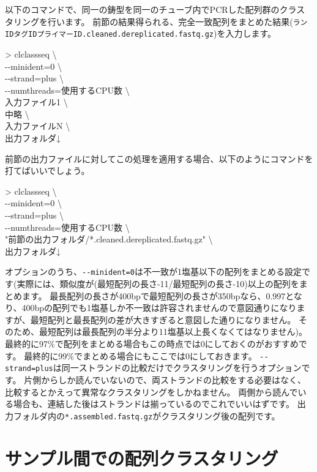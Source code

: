 \documentclass[titlepage,10pt,a4paper]{jsbook}
\newenvironment{cmd}{\begin{oframed}\raggedright\ttfamily\footnotesize\setlength{\baselineskip}{1.4em}}{\end{oframed}\vspace{-1em}}
\begin{document}
以下のコマンドで、同一の鋳型を同一のチューブ内でPCRした配列群のクラスタリングを行います。
前節の結果得られる、完全一致配列をまとめた結果(\texttt{ランID{\textunderscore}{\textunderscore}タグID{\textunderscore}{\textunderscore}プライマーID.cleaned.dereplicated.fastq.gz})を入力します。
\begin{cmd}
{\textgreater} clclassseq {\textbackslash}\\
{-}{-}minident=0 {\textbackslash}\\
{-}{-}strand=plus {\textbackslash}\\
{-}{-}numthreads=使用するCPU数 {\textbackslash}\\
入力ファイル1 {\textbackslash}\\
中略 {\textbackslash}\\
入力ファイルN {\textbackslash}\\
出力フォルダ↓
\end{cmd}
前節の出力ファイルに対してこの処理を適用する場合、以下のようにコマンドを打てばいいでしょう。
\begin{cmd}
{\textgreater} clclassseq {\textbackslash}\\
{-}{-}minident=0 {\textbackslash}\\
{-}{-}strand=plus {\textbackslash}\\
{-}{-}numthreads=使用するCPU数 {\textbackslash}\\
"前節の出力フォルダ/*.cleaned.dereplicated.fastq.gz" {\textbackslash}\\
出力フォルダ↓
\end{cmd}
オプションのうち、\texttt{{-}{-}minident=0}は不一致が1塩基以下の配列をまとめる設定です(実際には、類似度が(最短配列の長さ-11/最短配列の長さ-10)以上の配列をまとめます。
最長配列の長さが400bpで最短配列の長さが350bpなら、0.997となり、400bpの配列でも1塩基しか不一致は許容されませんので意図通りになりますが、最短配列と最長配列の差が大きすぎると意図した通りになりません。
そのため、最短配列は最長配列の半分より11塩基以上長くなくてはなりません)。
最終的に97\%で配列をまとめる場合もこの時点では0にしておくのがおすすめです。
最終的に99\%でまとめる場合にもここでは0にしておきます。
\texttt{{-}{-}strand=plus}は同一ストランドの比較だけでクラスタリングを行うオプションです。
片側からしか読んでいないので、両ストランドの比較をする必要はなく、比較するとかえって異常なクラスタリングをしかねません。
両側から読んでいる場合も、連結した後はストランドは揃っているのでこれでいいはずです。
出力フォルダ内の\texttt{*.assembled.fastq.gz}がクラスタリング後の配列です。

\section{サンプル間での配列クラスタリング}
\end{document}
